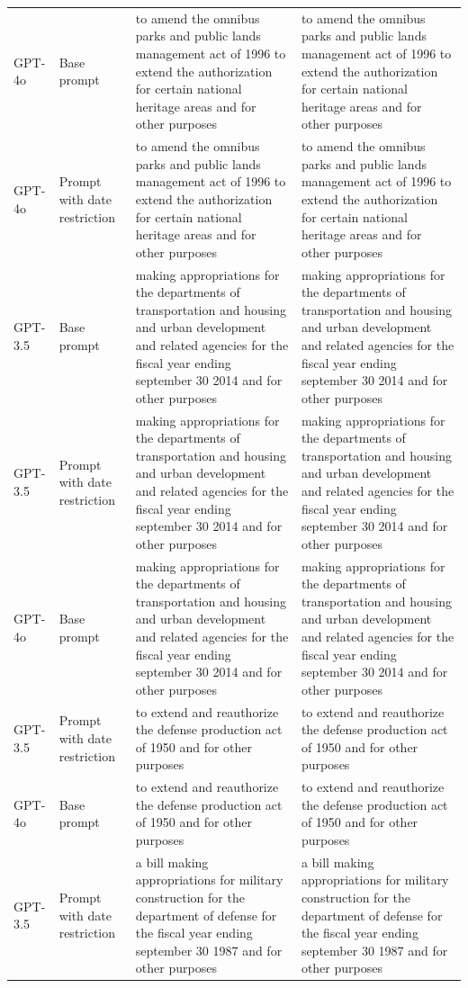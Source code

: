 \begin{longtable}{>{\raggedright\arraybackslash}p{1.4cm}>{\raggedright\arraybackslash}p{1.4cm}>{\raggedright\arraybackslash}p{5.5cm}>{\raggedright\arraybackslash}p{5.5cm}}
GPT-4o & Base prompt & to amend the omnibus parks and public lands management act of 1996 to extend the authorization for certain national heritage areas and for other purposes & to amend the omnibus parks and public lands management act of 1996 to extend the authorization for certain national heritage areas and for other purposes\\
GPT-4o & Prompt with date restriction & to amend the omnibus parks and public lands management act of 1996 to extend the authorization for certain national heritage areas and for other purposes & to amend the omnibus parks and public lands management act of 1996 to extend the authorization for certain national heritage areas and for other purposes\\
GPT-3.5 & Base prompt & making appropriations for the departments of transportation and housing and urban development and related agencies for the fiscal year ending september 30 2014 and for other purposes & making appropriations for the departments of transportation and housing and urban development and related agencies for the fiscal year ending september 30 2014 and for other purposes\\
GPT-3.5 & Prompt with date restriction & making appropriations for the departments of transportation and housing and urban development and related agencies for the fiscal year ending september 30 2014 and for other purposes & making appropriations for the departments of transportation and housing and urban development and related agencies for the fiscal year ending september 30 2014 and for other purposes\\
GPT-4o & Base prompt & making appropriations for the departments of transportation and housing and urban development and related agencies for the fiscal year ending september 30 2014 and for other purposes & making appropriations for the departments of transportation and housing and urban development and related agencies for the fiscal year ending september 30 2014 and for other purposes\\
GPT-3.5 & Prompt with date restriction & to extend and reauthorize the defense production act of 1950 and for other purposes & to extend and reauthorize the defense production act of 1950 and for other purposes\\
GPT-4o & Base prompt & to extend and reauthorize the defense production act of 1950 and for other purposes & to extend and reauthorize the defense production act of 1950 and for other purposes\\
GPT-3.5 & Prompt with date restriction & a bill making appropriations for military construction for the department of defense for the fiscal year ending september 30 1987 and for other purposes & a bill making appropriations for military construction for the department of defense for the fiscal year ending september 30 1987 and for other purposes\\

\end{longtable}
